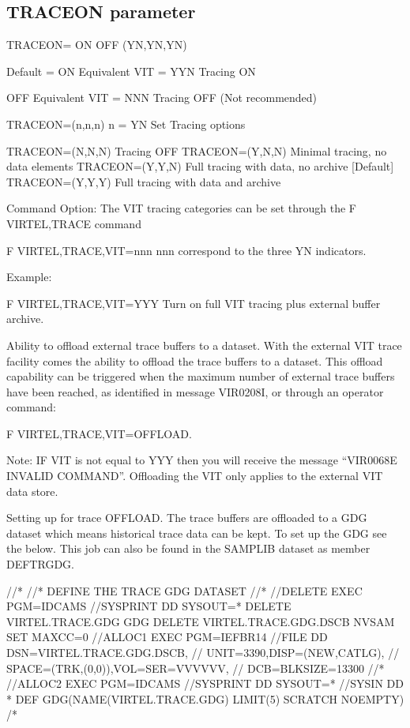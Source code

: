 \documentclass[letterpaper,10pt,english]{sphinxmanual}
\begin{document}
\subsection{TRACEON parameter}
\label{\detokenize{Installation_Guide:traceon-parameter}}\label{\detokenize{Installation_Guide:index-130}}
\begin{sphinxVerbatim}[commandchars=\\\{\}]
TRACEON= ON \textbar{} OFF \textbar{} (Y\textbar{}N,Y\textbar{}N,Y\textbar{}N)

Default = ON    Equivalent VIT = YYN    Tracing ON

OFF             Equivalent VIT = NNN    Tracing OFF (Not recommended)

TRACEON=(n,n,n)         n = Y\textbar{}N         Set Tracing options

TRACEON=(N,N,N)                 Tracing OFF
TRACEON=(Y,N,N)                 Minimal tracing, no data elements
TRACEON=(Y,Y,N)                 Full tracing with data, no archive [Default]
TRACEON=(Y,Y,Y)                 Full tracing with data and archive

Command Option:
The VIT tracing categories can be set through the F VIRTEL,TRACE command

F VIRTEL,TRACE,VIT=nnn                  nnn correspond to the three Y\textbar{}N indicators.

Example:

F VIRTEL,TRACE,VIT=YYY                  Turn on full VIT tracing plus external buffer archive.

Ability to offload external trace buffers to a dataset.
With the external VIT trace facility comes the ability to offload the trace buffers to a dataset. This offload capability can be triggered when the maximum number of external trace buffers have been reached, as identified in message VIR0208I, or through an operator command:

F VIRTEL,TRACE,VIT=OFFLOAD.

Note: IF VIT is not equal to YYY then you will receive the message “VIR0068E INVALID COMMAND”. Offloading the VIT only applies to the external VIT data store.

Setting up for trace \PYGZdq{}OFFLOAD\PYGZdq{}.
The trace buffers are offloaded to a GDG dataset which means historical trace data can be kept. To set up the GDG see the below. This job can also be found in the SAMPLIB dataset as member DEFTRGDG.

//*
//* DEFINE THE TRACE GDG DATASET
//*
//DELETE   EXEC PGM=IDCAMS
//SYSPRINT DD SYSOUT=*
 DELETE VIRTEL.TRACE.GDG GDG
 DELETE VIRTEL.TRACE.GDG.DSCB NVSAM
 SET MAXCC=0
//ALLOC1   EXEC PGM=IEFBR14
//FILE     DD DSN=VIRTEL.TRACE.GDG.DSCB,
//            UNIT=3390,DISP=(NEW,CATLG),
//            SPACE=(TRK,(0,0)),VOL=SER=VVVVVV,
//            DCB=BLKSIZE=13300
//*
//ALLOC2   EXEC PGM=IDCAMS
//SYSPRINT  DD SYSOUT=*
//SYSIN     DD *
 DEF GDG(NAME(VIRTEL.TRACE.GDG) LIMIT(5) SCRATCH NOEMPTY)
/*
\end{sphinxVerbatim}
\end{document}
